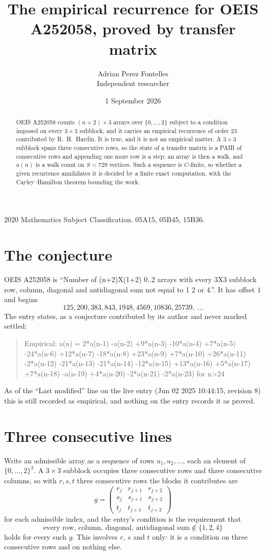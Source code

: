 \documentclass[11pt,a4paper]{article}
\title{The empirical recurrence for OEIS A252058, proved by transfer matrix}
\author{Adrian Perez Fontelles\\ \small Independent researcher}
\date{1 September 2026}
\theoremstyle{plain}
\theoremstyle{definition}
\begin{document}
\maketitle

\begin{abstract}
OEIS A252058 counts $(n+2)\times3$ arrays over $\{0,\dots,2\}$ subject to a condition imposed on
every $3\times3$ subblock, and it carries an empirical recurrence of order $23$
contributed by R.~H.~Hardin. It is true, and it is not an empirical matter. A $3\times3$
subblock spans three consecutive rows, so the state of a transfer matrix is a PAIR of
consecutive rows and appending one more row is a step; an array is then a walk, and
$a(n)$ is a walk count on $S=729$ vertices. Such a sequence is $C$-finite, so whether a given
recurrence annihilates it is decided by a finite exact computation, with the Cayley--Hamilton
theorem bounding the work.
\end{abstract}

\noindent\small 2020 Mathematics Subject Classification. 05A15, 05B45, 15B36.\normalsize

\section{The conjecture}

OEIS A252058 is ``Number of (n+2)X(1+2) 0..2 arrays with every 3X3 subblock row, column, diagonal and antidiagonal sum not equal to 1 2 or 4.''. It has offset $1$ and begins
\[
125, 200, 383, 843, 1948, 4569, 10836, 25739,\ \dots
\]
The entry states, as a conjecture contributed by its author and never marked settled:
\begin{quote}
Empirical: a(n) = 2*a(n-1) -a(n-2) +9*a(n-3) -10*a(n-4) +7*a(n-5) -24*a(n-6) +12*a(n-7) -18*a(n-8) +23*a(n-9) +7*a(n-10) +26*a(n-11) -2*a(n-12) -21*a(n-13) -21*a(n-14) -12*a(n-15) +13*a(n-16) +5*a(n-17) +7*a(n-18) -a(n-19) +4*a(n-20) -2*a(n-21) -2*a(n-23) for n>24
\end{quote}
As of the ``Last modified'' line on the live entry (Jun 02 2025 10:44:15, revision 8) this is still
recorded as empirical, and nothing on the entry records it as proved.

\section{Three consecutive lines}

Write an admissible array as a sequence of rows $u_1,u_2,\dots$, each an element of
$\{0,\dots,2\}^{3}$. A $3\times3$ subblock occupies three consecutive rows and
three consecutive columns, so with $r,s,t$ three consecutive rows the blocks it
contributes are
\[
g=\begin{pmatrix}r_j&r_{j+1}&r_{j+2}\\ s_j&s_{j+1}&s_{j+2}\\ t_j&t_{j+1}&t_{j+2}\end{pmatrix}
\]
for each admissible index, and the entry's condition is the requirement that
\[
\text{every row, column, diagonal, antidiagonal sum} \notin \{1,2,4\}
\]
holds for every such $g$. This involves $r$, $s$ and $t$ only: it is a condition on
three consecutive rows and on nothing else.
\end{document}
